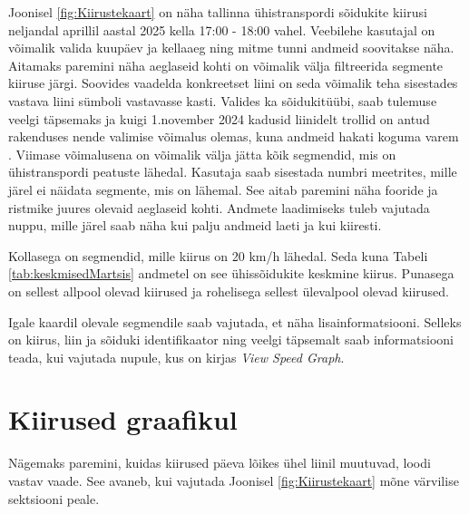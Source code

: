 Joonisel \ref{fig:Kiirustekaart} on näha tallinna ühistranspordi sõidukite kiirusi neljandal aprillil aastal 2025 kella 17:00 - 18:00 vahel. Veebilehe kasutajal on võimalik valida kuupäev ja kellaaeg ning mitme tunni andmeid soovitakse näha. Aitamaks paremini näha aeglaseid kohti on võimalik välja filtreerida segmente kiiruse järgi. Soovides vaadelda konkreetset liini on seda võimalik teha sisestades vastava liini sümboli vastavasse kasti. Valides ka sõidukitüübi, saab tulemuse veelgi täpsemaks ja kuigi 1.november 2024 kadusid liinidelt trollid on antud rakenduses nende valimise võimalus olemas, kuna andmeid hakati koguma varem \cite{trollid}. Viimase võimalusena on võimalik välja jätta kõik segmendid, mis on ühistranspordi peatuste lähedal. Kasutaja saab sisestada numbri meetrites, mille järel ei näidata segmente, mis on lähemal. See aitab paremini näha fooride ja ristmike juures olevaid aeglaseid kohti. Andmete laadimiseks tuleb vajutada nuppu, mille järel saab näha kui palju andmeid laeti ja kui kiiresti.

Kollasega on segmendid, mille kiirus on 20 km/h lähedal. Seda kuna Tabeli \ref{tab:keskmisedMartsis} andmetel on see ühissõidukite keskmine kiirus. Punasega on sellest allpool olevad kiirused ja rohelisega sellest ülevalpool olevad kiirused.

Igale kaardil olevale segmendile saab vajutada, et näha lisainformatsiooni. Selleks on kiirus, liin ja sõiduki identifikaator ning veelgi täpsemalt saab informatsiooni teada, kui vajutada nupule, kus on kirjas \textit{View Speed Graph}.

\section{Kiirused graafikul} 

Nägemaks paremini, kuidas kiirused päeva lõikes ühel liinil muutuvad, loodi vastav vaade. See avaneb, kui vajutada Joonisel \ref{fig:Kiirustekaart} mõne värvilise sektsiooni peale.

